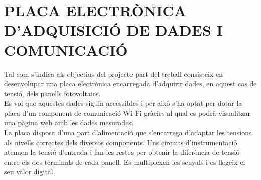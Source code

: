 \chapter{\uppercase{Placa electrònica d'adquisició de dades i comunicació}}
Tal com s'indica als objectius del projecte part del treball consisteix en desenvolupar una placa electrònica encarregada d'adquirir dades, en aquest cas de tensió, dels panells fotovoltaics.\\
\newline Es vol que aquestes dades siguin accessibles i per això s'ha optat per dotar la placa d'un component de comunicació Wi-Fi gràcies al qual es podrà visualitzar una pàgina web amb les dades mesurades.\\
\newline La placa disposa d'una part d'alimentació que s'encarrega d'adaptar les tensions als nivells correctes dels diversos components. Uns circuits d'instrumentació atenuen la tensió d'entrada i fan les restes per obtenir la diferència de tensió entre els dos terminals de cada panell. Es multiplexen les senyals i es llegeix el seu valor digital.

